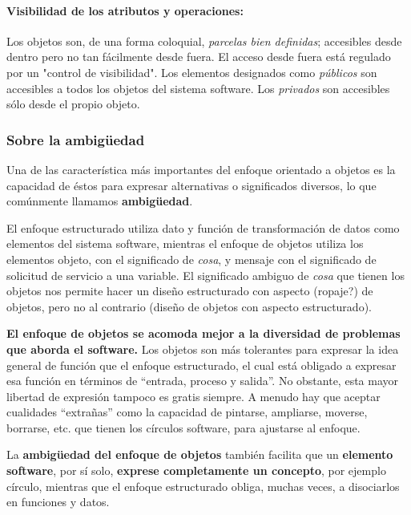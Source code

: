 \vspace{5mm}

\paragraph{Visibilidad de los atributos y operaciones:} Los objetos
son, de una forma coloquial, \emph{parcelas bien definidas};
accesibles desde dentro pero no tan fácilmente desde fuera. El acceso
desde fuera está regulado por un "control de visibilidad".
Los elementos designados como \emph{públicos} son accesibles a todos
los objetos del sistema software. Los \emph{privados} son accesibles
sólo desde el propio objeto.

\subsubsection{Sobre la ambigüedad} Una de las característica más
importantes del enfoque orientado a objetos es la capacidad de éstos
para expresar alternativas o significados diversos, lo que comúnmente
llamamos \textbf{ambigüedad}.

\vspace{5mm}

El enfoque estructurado utiliza dato y función de transformación de
datos como elementos del sistema software, mientras el enfoque de
objetos utiliza los elementos objeto, con el significado de
\emph{cosa}, y mensaje con el significado de solicitud de servicio a
una variable.  El significado ambiguo de \emph{cosa} que tienen los
objetos nos permite hacer un diseño estructurado con aspecto (ropaje?)
de objetos, pero no al contrario (diseño de objetos con aspecto
estructurado).

\vspace{5mm}

\textbf{El enfoque de objetos se acomoda mejor a la diversidad de
problemas que aborda el software.}  Los objetos son más tolerantes
para expresar la idea general de función que el enfoque estructurado,
el cual está obligado a expresar esa función en términos de “entrada,
proceso y salida”.  No obstante, esta mayor libertad de expresión
tampoco es gratis siempre. A menudo hay que aceptar cualidades
“extrañas” como la capacidad de pintarse, ampliarse, moverse,
borrarse, etc.  que tienen los círculos software, para ajustarse al
enfoque.

\vspace{5mm}

La \textbf{ambigüedad del enfoque de objetos} también facilita que un
\textbf{elemento software}, por sí solo, \textbf{exprese completamente
un concepto}, por ejemplo círculo, mientras que el enfoque
estructurado obliga, muchas veces, a disociarlos en funciones y datos.


